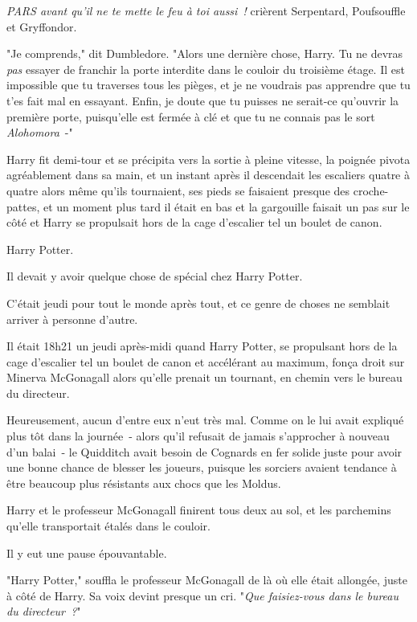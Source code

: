 \emph{PARS avant qu'il ne te mette le feu à toi aussi~!} crièrent Serpentard, Poufsouffle et Gryffondor.

"Je comprends," dit Dumbledore. "Alors une dernière chose, Harry. Tu ne devras \emph{pas} essayer de franchir la porte interdite dans le couloir du troisième étage. Il est impossible que tu traverses tous les pièges, et je ne voudrais pas apprendre que tu t'es fait mal en essayant. Enfin, je doute que tu puisses ne serait-ce qu'ouvrir la première porte, puisqu'elle est fermée à clé et que tu ne connais pas le sort \emph{Alohomora}~-"

Harry fit demi-tour et se précipita vers la sortie à pleine vitesse, la poignée pivota agréablement dans sa main, et un instant après il descendait les escaliers quatre à quatre alors même qu'ils tournaient, ses pieds se faisaient presque des croche-pattes, et un moment plus tard il était en bas et la gargouille faisait un pas sur le côté et Harry se propulsait hors de la cage d'escalier tel un boulet de canon.

\later

Harry Potter.

Il devait y avoir quelque chose de spécial chez Harry Potter.

C'était jeudi pour tout le monde après tout, et ce genre de choses ne semblait arriver à personne d'autre.

Il était 18h21 un jeudi après-midi quand Harry Potter, se propulsant hors de la cage d'escalier tel un boulet de canon et accélérant au maximum, fonça droit sur Minerva McGonagall alors qu'elle prenait un tournant, en chemin vers le bureau du directeur.

Heureusement, aucun d'entre eux n'eut très mal. Comme on le lui avait expliqué plus tôt dans la journée~- alors qu'il refusait de jamais s'approcher à nouveau d'un balai~- le Quidditch avait besoin de Cognards en fer solide juste pour avoir une bonne chance de blesser les joueurs, puisque les sorciers avaient tendance à être beaucoup plus résistants aux chocs que les Moldus.

Harry et le professeur McGonagall finirent tous deux au sol, et les parchemins qu'elle transportait étalés dans le couloir.

Il y eut une pause épouvantable.

"Harry Potter," souffla le professeur McGonagall de là où elle était allongée, juste à côté de Harry. Sa voix devint presque un cri. "\emph{Que faisiez-vous dans le bureau du directeur~?}"

